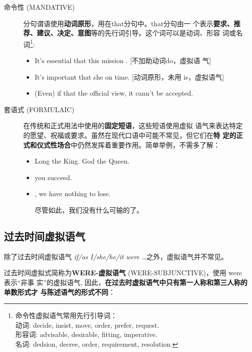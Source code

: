 \begin{description}
\item[命令性 (MANDATIVE)] 分句谓语使用\textbf{动词原形}，用在that分句中。that分句由一
  个表示\textbf{要求、推荐、建议、决定、意图}等的先行词引导。这个词可以是动词、形容
  词或名词\footnote{命令性虚拟语气常用先行引导词：\\ 动词: decide, insist, move,
    order,
    prefer, request.\\ 形容词: advisable, desirable, fitting, imperative.\\
    名词: dedsion, decree, order, requirement, resolution.}:
  \begin{itemize}
  \item It's essential that this mission . [不加助动词do，虚拟语
    气]
  \item It’s important that she  on time. [动词原形，未用 is，虚拟语气]
  \item (Even) if that  the official view, it cann't be accepted.
  \end{itemize}

\item[套语式 (FORMULAIC)] 在传统和正式用法中使用的\textbf{固定短语}，这些短语使用虚拟
  语气来表达特定的愿望、祝福或要求。虽然在现代口语中可能不常见，但它们在\textbf{特
    定的正式和仪式性场合}中仍然发挥着重要作用。简单举例，不需多了解：
  \begin{itemize}
  \item Long  the King. God  the Queen.
  \item {} you succeed.
  \item {}, we have nothing to lose.

    尽管如此，我们没有什么可输的了。
  \end{itemize}
\end{description}


\subsection{过去时间虚拟语气}

除了过去时间虚拟语气 \emph{if/as I/she/he/it were \ldots }之外，虚拟语气并不常见。

过去时间虚拟式简称为\textbf{WERE-虚拟语气} (WERE-SUBJUNCTIVE)，使用 were表示“非事
实”的虚拟语气, 因此，\textbf{在过去时虚拟语气中只有第一人称和第三人称的单数形式才
  与陈述语气的形式不同}：

